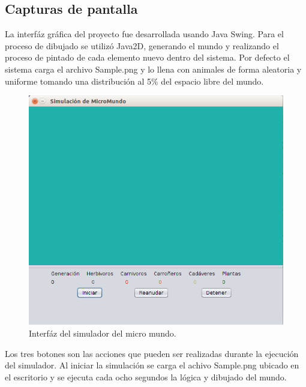   \subsection{Capturas de pantalla} 
    La interfáz gráfica del proyecto fue desarrollada usando Java Swing. Para el proceso de dibujado se utilizó Java2D, generando el mundo y realizando el proceso de pintado de cada elemento nuevo dentro del sistema. Por defecto el sistema carga el archivo Sample.png y lo llena con animales de forma aleatoria y uniforme tomando una distribución al 5\% del espacio libre del mundo.
    \linebreak
    \begin{figure}[h!]
      \centering
        \includegraphics[scale=0.4]{./images/MicroWorldSwingInterface.png}
        \caption{Interfáz del simulador del micro mundo.} 
    \end{figure}
    \linebreak
    Los tres botones son las acciones que pueden ser realizadas durante la ejecución del simulador. Al iniciar la simulación se carga el achivo Sample.png ubicado en el escritorio y se ejecuta cada ocho segundos la lógica y dibujado del mundo. 

